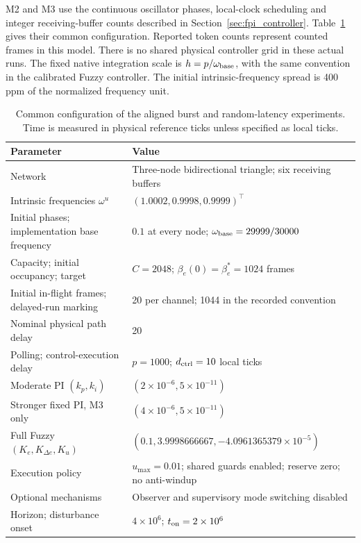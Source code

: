 M2 and M3 use the continuous oscillator phases, local-clock scheduling
and integer receiving-buffer counts described in
Section~\ref{sec:fpi_controller}. Table~\ref{tab:eval_setup} gives their
common configuration. Reported token counts represent counted frames
in this model. There is no shared physical controller grid in
these actual runs. The fixed native integration scale is
$h=p/\omega_{\rm base}$, with the same convention in the calibrated
Fuzzy controller. The initial intrinsic-frequency spread is 400 ppm of
the normalized frequency unit.

\begin{table}[t]
\caption{Common configuration of the aligned burst and random-latency experiments.
Time is measured in physical reference ticks unless specified as local ticks.}
\label{tab:eval_setup}
\centering
\begin{tabular}{@{}ll@{}}\toprule
Parameter & Value\\\midrule
Network & Three-node bidirectional triangle; six receiving buffers\\
Intrinsic frequencies $\omega^u$ & $(1.0002,0.9998,0.9999)^\top$\\
Initial phases; implementation base frequency & $0.1$ at every node; $\omega_{\rm base}=29999/30000$\\
Capacity; initial occupancy; target & $C=2048$; $\beta_e(0)=\beta_e^*=1024$ frames\\
Initial in-flight frames; delayed-run marking & 20 per channel; 1044 in the recorded convention\\
Nominal physical path delay & 20\\
Polling; control-execution delay & $p=1000$; $d_{\rm ctrl}=10$ local ticks\\
Moderate PI $(k_p,k_i)$ & $(2\times10^{-6},5\times10^{-11})$\\
Stronger fixed PI, M3 only & $(4\times10^{-6},5\times10^{-11})$\\
Full Fuzzy $(K_e,K_{\Delta e},K_u)$ & $(0.1,3.9998666667,-4.0961365379\times10^{-5})$\\
Execution policy & $u_{\max}=0.01$; shared guards enabled; reserve zero; no anti-windup\\
Optional mechanisms & Observer and supervisory mode switching disabled\\
Horizon; disturbance onset & $4\times10^6$; $t_{\rm on}=2\times10^6$\\\bottomrule
\end{tabular}
\end{table}

